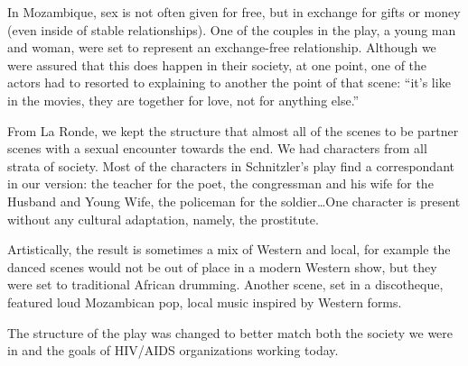 \documentclass[article,twocolumn,twoside]{memoir}
\begin{document}
In Mozambique, sex is not often given for free, but in exchange for gifts or
money (even inside of stable relationships). One of the couples in the play, a
young man and woman, were set to represent an exchange-free relationship.
Although we were assured that this does happen in their society, at one point,
one of the actors had to resorted to explaining to another the point of that
scene: ``it's like in the movies, they are together for love, not for anything
else.''

From La Ronde, we kept the structure that almost all of the scenes to be
partner scenes with a sexual encounter towards the end. We had characters from
all strata of society. Most of the characters in Schnitzler's play find a
correspondant in our version: the teacher for the poet, the congressman and his
wife for the Husband and Young Wife, the policeman for the soldier\ldots One
character is present without any cultural adaptation, namely, the prostitute.

Artistically, the result is sometimes a mix of Western and local, for example
the danced scenes would not be out of place in a modern Western show, but they
were set to traditional African drumming. Another scene, set in a discotheque,
featured loud Mozambican pop, local music inspired by Western forms.

The structure of the play was changed to better match both the society we were
in and the goals of HIV/AIDS organizations working today.
\end{document}
